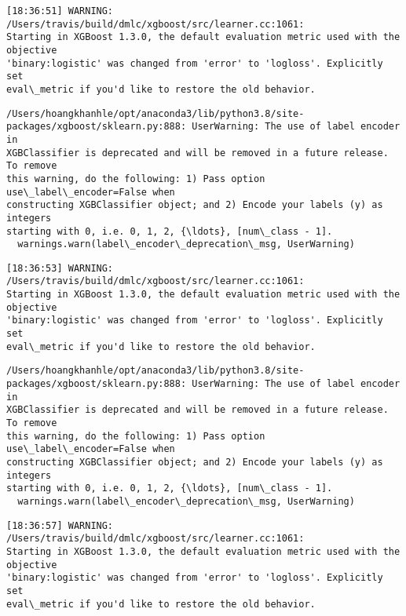 \documentclass[11pt]{article}
\begin{document}
    \begin{Verbatim}[commandchars=\\\{\}]
[18:36:51] WARNING: /Users/travis/build/dmlc/xgboost/src/learner.cc:1061:
Starting in XGBoost 1.3.0, the default evaluation metric used with the objective
'binary:logistic' was changed from 'error' to 'logloss'. Explicitly set
eval\_metric if you'd like to restore the old behavior.
    \end{Verbatim}

    \begin{Verbatim}[commandchars=\\\{\}]
/Users/hoangkhanhle/opt/anaconda3/lib/python3.8/site-
packages/xgboost/sklearn.py:888: UserWarning: The use of label encoder in
XGBClassifier is deprecated and will be removed in a future release. To remove
this warning, do the following: 1) Pass option use\_label\_encoder=False when
constructing XGBClassifier object; and 2) Encode your labels (y) as integers
starting with 0, i.e. 0, 1, 2, {\ldots}, [num\_class - 1].
  warnings.warn(label\_encoder\_deprecation\_msg, UserWarning)
    \end{Verbatim}

    \begin{Verbatim}[commandchars=\\\{\}]
[18:36:53] WARNING: /Users/travis/build/dmlc/xgboost/src/learner.cc:1061:
Starting in XGBoost 1.3.0, the default evaluation metric used with the objective
'binary:logistic' was changed from 'error' to 'logloss'. Explicitly set
eval\_metric if you'd like to restore the old behavior.
    \end{Verbatim}

    \begin{Verbatim}[commandchars=\\\{\}]
/Users/hoangkhanhle/opt/anaconda3/lib/python3.8/site-
packages/xgboost/sklearn.py:888: UserWarning: The use of label encoder in
XGBClassifier is deprecated and will be removed in a future release. To remove
this warning, do the following: 1) Pass option use\_label\_encoder=False when
constructing XGBClassifier object; and 2) Encode your labels (y) as integers
starting with 0, i.e. 0, 1, 2, {\ldots}, [num\_class - 1].
  warnings.warn(label\_encoder\_deprecation\_msg, UserWarning)
    \end{Verbatim}

    \begin{Verbatim}[commandchars=\\\{\}]
[18:36:57] WARNING: /Users/travis/build/dmlc/xgboost/src/learner.cc:1061:
Starting in XGBoost 1.3.0, the default evaluation metric used with the objective
'binary:logistic' was changed from 'error' to 'logloss'. Explicitly set
eval\_metric if you'd like to restore the old behavior.
    \end{Verbatim}
\end{document}

